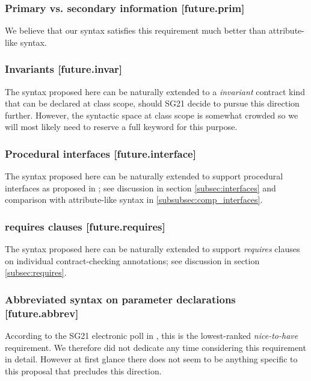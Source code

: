 \subsubsection{Primary vs. secondary information  [future.prim]}

We believe that our syntax satisfies this requirement much better than attribute-like syntax.

\subsubsection{Invariants  [future.invar]}

The syntax proposed here can be naturally extended to a \emph{invariant} contract kind that can be declared at class scope, should SG21 decide to pursue this direction further. However, the syntactic space at class scope is somewhat crowded so we will most likely need to reserve a full keyword for this purpose.

\subsubsection{Procedural interfaces  [future.interface]}

The syntax proposed here can be naturally extended to support procedural interfaces as proposed in \cite{P0465R0}; see discussion in section \ref{subsec:interfaces} and comparison with attribute-like syntax in \ref{subsubsec:comp_interfaces}.

\subsubsection{requires clauses  [future.requires]}

The syntax proposed here can be naturally extended to support \emph{requires} clauses on individual contract-checking annotations; see discussion in section \ref{subsec:requires}.

\subsubsection{Abbreviated syntax on parameter declarations  [future.abbrev]}

According to the SG21 electronic poll in \cite{P2885R2}, this is the lowest-ranked \emph{nice-to-have} requirement. We therefore did not dedicate any time considering this requirement in detail. However at first glance there does not seem to be anything specific to this proposal that precludes this direction.

